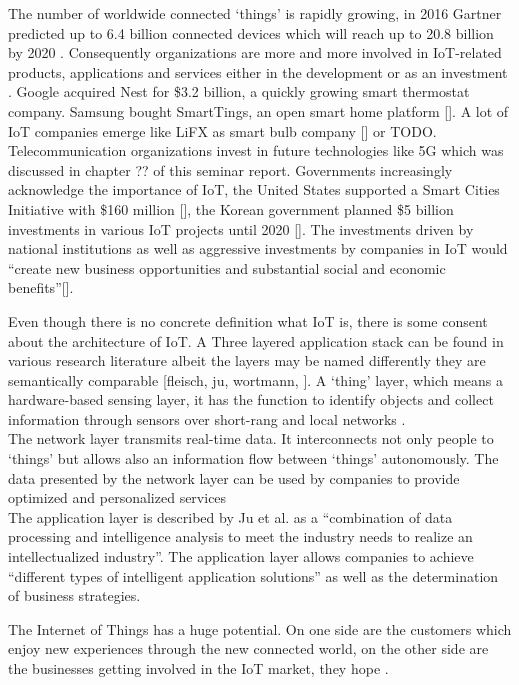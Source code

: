 The number of worldwide connected `things' is rapidly growing, in 2016 Gartner predicted up to 6.4 billion connected devices which will reach up to 20.8 billion by 2020 \cite{gartner}. Consequently organizations are more and more involved in IoT-related products, applications and services either in the development or as an investment \cite{ju}. Google acquired Nest for \$3.2 billion, a quickly growing smart thermostat company. Samsung bought SmartTings, an open smart home platform []. A lot of IoT companies emerge like LiFX as smart bulb company [] or TODO. Telecommunication organizations invest in future technologies like 5G which was discussed in chapter ?? of this seminar report. Governments increasingly acknowledge the importance of IoT, the United States supported a Smart Cities Initiative with \$160 million [], the Korean government planned \$5 billion investments in various IoT projects until 2020 []. The investments driven by national institutions as well as aggressive investments by companies in IoT would ``create new business opportunities and substantial social and economic benefits''[]. 

Even though there is no concrete definition what IoT is, there is some consent about the architecture of IoT. A Three layered application stack can be found in various research literature albeit the layers may be named differently they are semantically comparable [fleisch, ju, wortmann, ]. A `thing' layer, which means a hardware-based sensing layer, it has the function to identify objects and collect information through sensors over short-rang and local networks \cite{ju}.\\
The network layer transmits real-time data. It interconnects not only people to `things' but allows also an information flow between `things' autonomously. The data presented by the network layer can be used by companies to provide optimized and personalized services \cite{ju}\\
The application layer is described by Ju et al. as a ``combination of data processing and intelligence analysis to meet the industry needs to realize an intellectualized industry''. The application layer allows companies to achieve ``different types of intelligent application solutions'' as well as the determination of business strategies\cite{ju}.

The Internet of Things has a huge potential. On one side are the customers which enjoy new experiences through the new connected world, on the other side are the businesses getting involved in the IoT market, they hope \cite{ju}.




